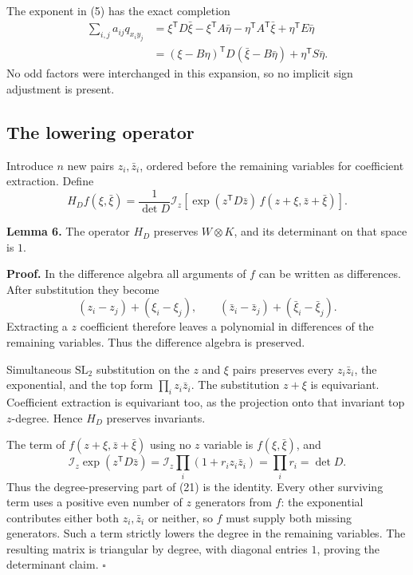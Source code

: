 \documentclass[11pt]{article}
\begin{document}
The exponent in (5) has the exact completion \[
\begin{aligned}
\sum_{i,j}a_{ij}q_{x_i y_j}
&=\xi^{\mathsf T}D\bar\xi-\xi^{\mathsf T}A\bar\eta
  -\eta^{\mathsf T}A^{\mathsf T}\bar\xi+\eta^{\mathsf T}E\bar\eta\\
&=(\xi-B\eta)^{\mathsf T}D(\bar\xi-B\bar\eta)
  +\eta^{\mathsf T}S\bar\eta.
\end{aligned}
\tag{20}
\] No odd factors were interchanged in this expansion, so no implicit sign adjustment is present.

\subsection{The lowering operator}\label{the-lowering-operator}

Introduce \(n\) new pairs \(z_i,\bar z_i\), ordered before the remaining variables for coefficient extraction. Define \[
H_D f(\xi,\bar\xi)
=\frac1{\det D}\mathcal I_z\left[
 \exp(z^{\mathsf T}D\bar z)\,
 f(z+\xi,\bar z+\bar\xi)\right].
\tag{21}
\]

\textbf{Lemma 6.} The operator \(H_D\) preserves \(W\otimes K\), and its determinant on that space is \(1\).

\textbf{Proof.} In the difference algebra all arguments of \(f\) can be written as differences. After substitution they become \[
(z_i-z_j)+(\xi_i-\xi_j),\qquad
(\bar z_i-\bar z_j)+(\bar\xi_i-\bar\xi_j).
\] Extracting a \(z\) coefficient therefore leaves a polynomial in differences of the remaining variables. Thus the difference algebra is preserved.

Simultaneous \(\mathrm{SL}_2\) substitution on the \(z\) and \(\xi\) pairs preserves every \(z_i\bar z_i\), the exponential, and the top form \(\prod_i z_i\bar z_i\). The substitution \(z+\xi\) is equivariant. Coefficient extraction is equivariant too, as the projection onto that invariant top \(z\)-degree. Hence \(H_D\) preserves invariants.

The term of \(f(z+\xi,\bar z+\bar\xi)\) using no \(z\) variable is \(f(\xi,\bar\xi)\), and \[
\mathcal I_z\exp(z^{\mathsf T}D\bar z)
=\mathcal I_z\prod_i(1+r_i z_i\bar z_i)
=\prod_i r_i=\det D.
\tag{22}
\] Thus the degree-preserving part of (21) is the identity. Every other surviving term uses a positive even number of \(z\) generators from \(f\): the exponential contributes either both \(z_i,\bar z_i\) or neither, so \(f\) must supply both missing generators. Such a term strictly lowers the degree in the remaining variables. The resulting matrix is triangular by degree, with diagonal entries \(1\), proving the determinant claim. \(\square\)
\end{document}
